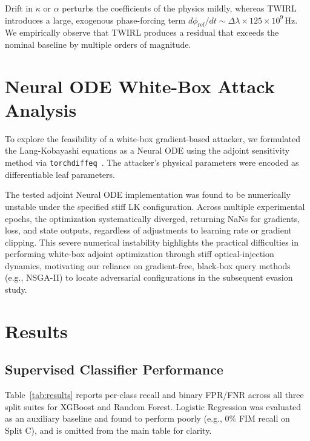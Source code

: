 \documentclass[journal,twocolumn]{IEEEtran}
\newcommand{\phiref}{\phi_{\mathrm{ref}}}
\newcommand{\kap}{\kappa}
\begin{document}
Drift in $\kap$ or $\alpha$ perturbs the coefficients of the physics mildly, whereas TWIRL introduces a large, exogenous phase-forcing term $d\phiref/dt \sim \Delta\lambda \times 125 \times 10^9\, \mathrm{Hz}$. We empirically observe that TWIRL produces a residual that exceeds the nominal baseline by multiple orders of magnitude. 

\section{Neural ODE White-Box Attack Analysis}
\label{sec:node}

To explore the feasibility of a white-box gradient-based attacker, we formulated the Lang-Kobayashi equations as a Neural ODE using the adjoint sensitivity method via \texttt{torchdiffeq}~\cite{chen2018}. The attacker's physical parameters were encoded as differentiable leaf parameters.

The tested adjoint Neural ODE implementation was found to be numerically unstable under the specified stiff LK configuration. Across multiple experimental epochs, the optimization systematically diverged, returning NaNs for gradients, loss, and state outputs, regardless of adjustments to learning rate or gradient clipping. This severe numerical instability highlights the practical difficulties in performing white-box adjoint optimization through stiff optical-injection dynamics, motivating our reliance on gradient-free, black-box query methods (e.g., NSGA-II) to locate adversarial configurations in the subsequent evasion study.


\section{Results}
\label{sec:results}

\subsection{Supervised Classifier Performance}

Table~\ref{tab:results} reports per-class recall and binary FPR/FNR across all
three split suites for XGBoost and Random Forest. Logistic Regression was evaluated as an auxiliary baseline and found to perform poorly (e.g., $0\%$ FIM recall on Split C), and is omitted from the main table for clarity.
\end{document}
